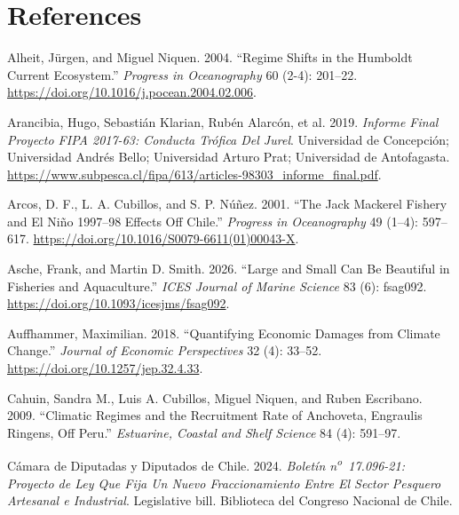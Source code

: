 \documentclass[
  11pt,
]{article}
\newlength{\cslhangindent}
\newenvironment{CSLReferences}[2] %
 {\begin{list}{}{%
  \setlength{\itemindent}{0pt}
  \setlength{\leftmargin}{0pt}
  \setlength{\parsep}{0pt}
  \ifodd #1
   \setlength{\leftmargin}{\cslhangindent}
   \setlength{\itemindent}{-1\cslhangindent}
  \fi
  \setlength{\itemsep}{#2\baselineskip}}}
 {\end{list}}
\begin{document}
\section*{References}\label{references}

\protect{}\label{refs}
\begin{CSLReferences}{1}{1}
Alheit, Jürgen, and Miguel Niquen. 2004. {``Regime Shifts in the Humboldt Current Ecosystem.''} \emph{Progress in Oceanography} 60 (2-4): 201--22. \url{https://doi.org/10.1016/j.pocean.2004.02.006}.

Arancibia, Hugo, Sebastián Klarian, Rubén Alarcón, et al. 2019. \emph{Informe Final Proyecto FIPA 2017-63: Conducta Trófica Del Jurel}. Universidad de Concepción; Universidad Andrés Bello; Universidad Arturo Prat; Universidad de Antofagasta. \url{https://www.subpesca.cl/fipa/613/articles-98303_informe_final.pdf}.

Arcos, D. F., L. A. Cubillos, and S. P. Núñez. 2001. {``The Jack Mackerel Fishery and {El Ni{ñ}o} 1997--98 Effects Off {Chile}.''} \emph{Progress in Oceanography} 49 (1--4): 597--617. \url{https://doi.org/10.1016/S0079-6611(01)00043-X}.

Asche, Frank, and Martin D. Smith. 2026. {``Large and Small Can Be Beautiful in Fisheries and Aquaculture.''} \emph{ICES Journal of Marine Science} 83 (6): fsag092. \url{https://doi.org/10.1093/icesjms/fsag092}.

Auffhammer, Maximilian. 2018. {``Quantifying Economic Damages from Climate Change.''} \emph{Journal of Economic Perspectives} 32 (4): 33--52. \url{https://doi.org/10.1257/jep.32.4.33}.

Cahuin, Sandra M., Luis A. Cubillos, Miguel Niquen, and Ruben Escribano. 2009. {``Climatic Regimes and the Recruitment Rate of Anchoveta, Engraulis Ringens, Off Peru.''} \emph{Estuarine, Coastal and Shelf Science} 84 (4): 591--97.

Cámara de Diputadas y Diputados de Chile. 2024. \emph{Boletín n\textsuperscript{o}~17.096-21: Proyecto de Ley Que Fija Un Nuevo Fraccionamiento Entre El Sector Pesquero Artesanal e Industrial}. Legislative bill. Biblioteca del Congreso Nacional de Chile.


\end{CSLReferences}
\end{document}
